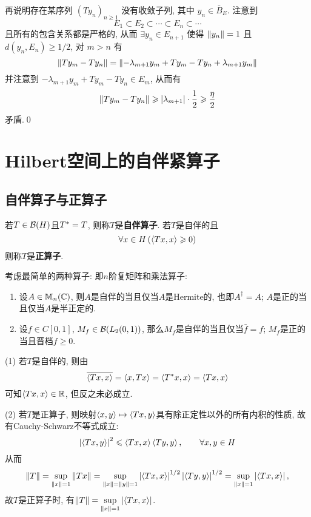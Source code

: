 \begin{Proof}
        再说明存在某序列 $ (Ty_{n})_{n\geqslant1} $ 没有收敛子列, 其中 $ y_{n}\in\bar{B}_{E} $. 注意到
        \[
            E_{1}\subset E_{2}\subset\cdots\subset E_{n}\subset\cdots
        \]
        且所有的包含关系都是严格的, 从而 $ \exists y_{n}\in E_{n+1} $ 使得 $ \left\| y_{n} \right\|=1 $ 且 $ d(y_{n}, E_{n})\geqslant1/2 $, 对 $ m>n $ 有
        \[
            \left\| Ty_{m}-Ty_{n} \right\|=\left\| -\lambda_{m+1}y_{m}+Ty_{m}-Ty_{n}+\lambda_{m+1}y_{m} \right\|
        \]
        并注意到 $ -\lambda_{m+1}y_{m}+Ty_{m}-Ty_{n}\in E_{m} $, 从而有
        \[
            \left\| Ty_{m}-Ty_{n} \right\|\geqslant\left| \lambda_{m+1} \right| \cdot\frac{1}{2}\geqslant\frac{\eta}{2}
        \]
        矛盾.\qed
    \end{Proof}
    
\section{Hilbert空间上的自伴紧算子}

    \subsection{自伴算子与正算子}
    
    \begin{Definition}
    若$ T\in\mathcal{B}(H) $且$ T^{*}=T $, 则称$ T $是\textbf{自伴算子}. 若$ T $是自伴的且
    \[
    \forall x\in H\,(\left\langle Tx,x \right\rangle\geqslant 0)
    \]
    则称$ T $是\textbf{正算子}.
    \end{Definition}
    
    \begin{Example}
    考虑最简单的两种算子: 即$ n $阶复矩阵和乘法算子:
    \begin{enumerate}[(1)]
    \item 设$ A\in\mathbb{M}_n(\mathbb{C}) $, 则$ A $是自伴的当且仅当$ A $是Hermite的, 也即$ A^\dagger=A $; $ A $是正的当且仅当$ A $是半正定的.
    \item 设$ f\in C[0,1] $, $ M_f\in\mathcal{B}(L_2(0,1)) $, 那么$ M_f $是自伴的当且仅当$ \bar{f}=f $; $ M_f $是正的当且晋档$ f\geqslant 0 $.
    \end{enumerate}
    \end{Example}
    
    \begin{Remark}
    (1) 若$ T $是自伴的, 则由
    \[
    \overline{\left\langle Tx,x \right\rangle}=\left\langle x,Tx \right\rangle=\left\langle T^{*}x,x \right\rangle=\left\langle Tx,x \right\rangle
    \]
    可知$ \left\langle Tx,x \right\rangle\in\mathbb{R} $, 但反之未必成立.
    
    (2) 若$ T $是正算子, 则映射$ \left\langle x,y \right\rangle\mapsto\left\langle Tx,y \right\rangle $具有除正定性以外的所有内积的性质, 故有Cauchy-Schwarz不等式成立:
    \[
    \left| \left\langle Tx,y \right\rangle \right| ^2\leqslant\left\langle Tx,x \right\rangle\left\langle Ty,y \right\rangle,\qquad\forall x,y\in H
    \]
    从而
    \[
    \left\| T \right\|=\sup_{\left\| x \right\|=1}\left\| Tx \right\|=\sup_{\left\| x \right\|=\left\| y \right\|=1}\left| \left\langle Tx,x \right\rangle \right| ^{1/2}\left| \left\langle Ty,y \right\rangle \right| ^{1/2}=\sup_{\left\| x \right\|=1}\left| \left\langle Tx,x \right\rangle \right| ,
    \]
    故$ T $是正算子时, 有$ \left\| T \right\|=\sup\limits_{\left\| x \right\|=1}\left| \left\langle Tx,x \right\rangle \right|  $.
    \end{Remark}
    
